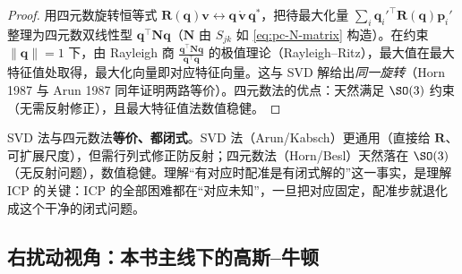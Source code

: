 \begin{proof}
用四元数旋转恒等式 $\mathbf{R}(\mathbf{q})\mathbf{v}\leftrightarrow\mathbf{q}\,\mathring{\mathbf{v}}\,\mathbf{q}^\ast$，把待最大化量 $\sum_i\mathbf{q}_i'^\top\mathbf{R}(\mathbf{q})\mathbf{p}_i'$ 整理为四元数双线性型 $\mathbf{q}^\top\mathbf{N}\mathbf{q}$（$\mathbf{N}$ 由 $S_{jk}$ 如 \cref{eq:pc-N-matrix} 构造）。在约束 $\|\mathbf{q}\|=1$ 下，由 Rayleigh 商 $\frac{\mathbf{q}^\top\mathbf{N}\mathbf{q}}{\mathbf{q}^\top\mathbf{q}}$ 的极值理论（Rayleigh--Ritz），最大值在最大特征值处取得，最大化向量即对应特征向量。这与 SVD 解给出\emph{同一旋转}（Horn 1987 与 Arun 1987 同年证明两路等价）。四元数法的优点：天然满足 $\SO(3)$ 约束（无需反射修正），且最大特征值法数值稳健。
\end{proof}

\begin{insight}
SVD 法与四元数法\textbf{等价、都闭式}。SVD 法（Arun/Kabsch）更通用（直接给 $\mathbf{R}$、可扩展尺度），但需行列式修正防反射；四元数法（Horn/Besl）天然落在 $\SO(3)$（无反射问题），数值稳健。理解“有对应时配准是有闭式解的”这一事实，是理解 ICP 的关键：ICP 的全部困难都在“对应未知”，一旦把对应固定，配准步就退化成这个干净的闭式问题。
\end{insight}

\subsection{右扰动视角：本书主线下的高斯--牛顿}
\label{sec:pc-icp-rightpert}

